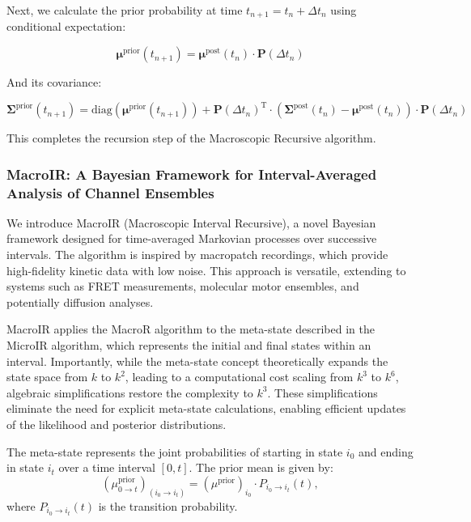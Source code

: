 \documentclass[pdflatex,sn-mathphys-num]{sn-jnl}%
\theoremstyle{thmstyleone}%
\theoremstyle{thmstyletwo}%
\theoremstyle{thmstylethree}%
\begin{document}
Next, we calculate the prior probability at time \( t_{n+1} = t_n + \Delta t_n \) using conditional expectation:

\begin{equation}
	\boldsymbol{\mu}^{\text{prior}}(t_{n+1}) = \boldsymbol{\mu}^{\text{post}}(t_n) \cdot \mathbf{P}(\Delta t_n)
	\label{eq:macro_mean_next_prior}
\end{equation}

And its covariance:

\begin{equation}
	\boldsymbol{\Sigma}^{\text{prior}}(t_{n+1}) = \mathrm{diag}(\boldsymbol{\mu}^{\text{prior}}(t_{n+1})) + \mathbf{P}(\Delta t_n)^{\mathrm{T}} \cdot \left( \boldsymbol{\Sigma}^{\text{post}}(t_n) - \boldsymbol{\mu}^{\text{post}}(t_n) \right) \cdot \mathbf{P}(\Delta t_n)
	\label{eq:macro_mean_next_cov}
\end{equation}

This completes the recursion step of the Macroscopic Recursive algorithm.


\subsubsection{MacroIR: A Bayesian Framework for Interval-Averaged Analysis of Channel Ensembles}

We introduce MacroIR (Macroscopic Interval Recursive), a novel Bayesian framework designed for time-averaged Markovian processes over successive intervals. The algorithm is inspired by macropatch recordings, which provide high-fidelity kinetic data with low noise. This approach is versatile, extending to systems such as FRET measurements, molecular motor ensembles, and potentially diffusion analyses.

MacroIR applies the MacroR algorithm to the meta-state described in the MicroIR algorithm, which represents the initial and final states within an interval. Importantly, while the meta-state concept theoretically expands the state space from \( k \) to \( k^2 \), leading to a computational cost scaling from \( k^3 \) to \( k^6 \), algebraic simplifications restore the complexity to \( k^3 \). These simplifications eliminate the need for explicit meta-state calculations, enabling efficient updates of the likelihood and posterior distributions.

The meta-state represents the joint probabilities of starting in state \( i_0 \) and ending in state \( i_t \) over a time interval \( [0, t] \). The prior mean is given by:
\begin{equation}
	(\mu^{\text{prior}}_{0 \rightarrow t})_{(i_0 \rightarrow i_t)} = (\mu^{\text{prior}})_{i_0} \cdot P_{i_0 \rightarrow i_t}(t),
	\label{eq:meta_mean_prior}
\end{equation}
where \( P_{i_0 \rightarrow i_t}(t) \) is the transition probability.
\end{document}
